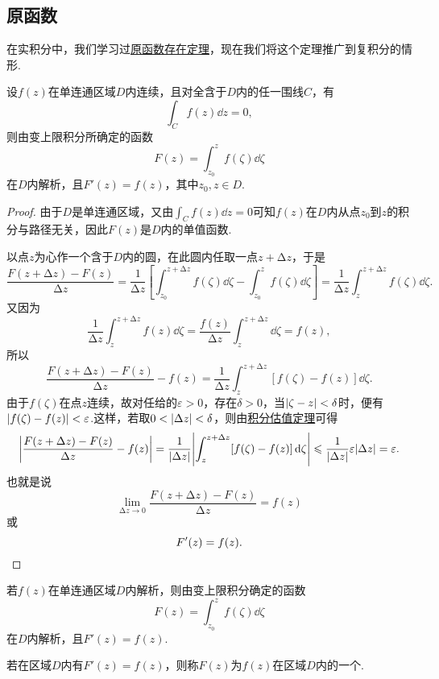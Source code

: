 \subsection{原函数}
在实积分中，我们学习过\hyperref[theorem:定积分.原函数存在定理]{原函数存在定理}，现在我们将这个定理推广到复积分的情形.
\begin{theorem}\label{theorem:解析函数的积分表示.原函数1}
设\(f(z)\)在单连通区域\(D\)内连续，且对全含于\(D\)内的任一围线\(C\)，有\[
\int_C f(z) \dd{z} = 0,
\]则由变上限积分所确定的函数\[
F(z) = \int_{z_0}^z f(\zeta) \dd{\zeta}
\]在\(D\)内解析，且\(F'(z) = f(z)\)，其中\(z_0, z \in D\).
\begin{proof}
由于\(D\)是单连通区域，又由\(\int_C f(z) \dd{z}=0\)可知\(f(z)\)在\(D\)内从点\(z_0\)到\(z\)的积分与路径无关，因此\(F(z)\)是\(D\)内的单值函数.

以点\(z\)为心作一个含于\(D\)内的圆，在此圆内任取一点\(z+\increment z\)，于是\[
\frac{F(z+\increment z)-F(z)}{\increment z}
= \frac{1}{\increment z}\left[
 \int_{z_0}^{z+\increment z} f(\zeta) \dd{\zeta}
 -\int_{z_0}^z f(\zeta) \dd{\zeta}
\right]
= \frac{1}{\increment z} \int_z^{z+\increment z} f(\zeta) \dd{\zeta}.
\]又因为\[
\frac{1}{\increment z} \int_z^{z+\increment z} f(z) \dd{\zeta}
= \frac{f(z)}{\increment z} \int_z^{z+\increment z} \dd{\zeta} = f(z),
\]所以\[
\frac{F(z+\increment z)-F(z)}{\increment z} - f(z)
= \frac{1}{\increment z} \int_z^{z+\increment z} [f(\zeta)-f(z)]\dd{\zeta}.
\]由于\(f(\zeta)\)在点\(z\)连续，故对任给的\(\varepsilon > 0\)，存在\(\delta > 0\)，当\(\abs{\zeta - z} < \delta\)时，便有\(\abs{f(\zeta)-f(z)} < \varepsilon\).这样，若取\(0<\abs{\Delta z}<\delta\)，则由\hyperref[theorem:解析函数的积分表示.积分估值定理]{积分估值定理}可得\[
\abs{\frac{F(z+\Delta z)-F(z)}{\Delta z} - f(z)}
= \frac{1}{\abs{\Delta z}} \abs{ \int_z^{z+\Delta z} [f(\zeta)-f(z)]\dd{\zeta} }
\leqslant \frac{1}{\abs{\Delta z}} \varepsilon \abs{\Delta z}
= \varepsilon.
\]也就是说\[
\lim\limits_{\increment z\to0} \frac{F(z+\increment z)-F(z)}{\increment z} = f(z)
\]或\[
F'(z) = f(z).
\qedhere
\]
\end{proof}
\end{theorem}

\begin{corollary}\label{theorem:解析函数的积分表示.原函数2}
若\(f(z)\)在单连通区域\(D\)内解析，则由变上限积分确定的函数\[
F(z) = \int_{z_0}^z f(\zeta) \dd{\zeta}
\]在\(D\)内解析，且\(F'(z) = f(z)\).
\end{corollary}

\begin{definition}
若在区域\(D\)内有\(F'(z)=f(z)\)，则称\(F(z)\)为\(f(z)\)在区域\(D\)内的一个.
\end{definition}

